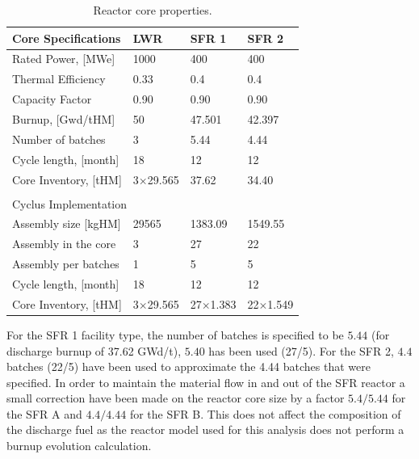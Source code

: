 \documentclass[12pt]{article}
\begin{document}
\begin{table}[h!]
    \centering
    \begin{tabularx}{350pt}{lXXX}
      \hline
      Core Specifications   &  LWR             &  SFR 1            &  SFR 2            \\
      \hline
      Rated Power, [MWe]    &  1000            &  400              &  400              \\
      Thermal Efficiency    &  0.33            &  0.4              &  0.4              \\
      Capacity Factor       &  0.90            &  0.90             &  0.90             \\
      Burnup, [Gwd/tHM]     &  50              &  47.501           &  42.397           \\
      Number of batches     &  3               &  5.44             &  4.44             \\
      Cycle length, [month] &  18              &  12               &  12               \\
      Core Inventory, [tHM] &  3$\times$29.565 &  37.62            &  34.40            \\
                                                                                       \\
      \hline
      \multicolumn{4}{l}{Cyclus Implementation}                                        \\ 
      \hline
      Assembly size [kgHM]  &  29565           &  1383.09          & 1549.55           \\
      Assembly in the core  &  3               &  27               &  22               \\
      Assembly per batches  &  1               &  5                &  5                \\
      Cycle length, [month] &  18              &  12               &  12               \\
      Core Inventory, [tHM] &  3$\times$29.565 &  27$\times$1.383  &  22$\times$1.549  \\
      \hline
    \end{tabularx}
    \caption{Reactor core properties.}
    \label{tab:reactor}
\end{table}


For the SFR 1 facility type, the number of batches is specified to be $5.44$
(for discharge burnup of 37.62 GWd/t), $5.40$ has been used (27/5). For the SFR
2, $4.4$ batches (22/5) have been used to approximate the 4.44 batches that were
specified.  In order to maintain the material flow in and out of the SFR reactor
a small correction have been made on the reactor core size by a factor
$5.4/5.44$ for the SFR A and $4.4/4.44$ for the SFR B. This does not affect the
composition of the discharge fuel as the reactor model used for this analysis
does not perform a burnup evolution calculation.
\end{document}
